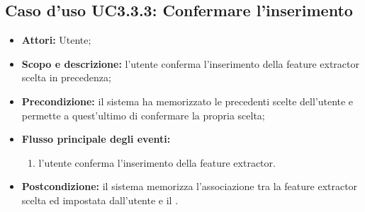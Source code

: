 \subsection{Caso d'uso UC3.3.3: Confermare l'inserimento}
\begin{itemize}
\item \textbf{Attori:} Utente;
\item \textbf{Scopo e descrizione:} l'utente conferma l'inserimento della feature extractor\glossario{} scelta in precedenza;
\item \textbf{Precondizione:} il sistema ha memorizzato le precedenti scelte dell'utente e permette a quest'ultimo di confermare la propria scelta;
\item \textbf{Flusso principale degli eventi:}
\begin{enumerate}
\item l'utente conferma l'inserimento della feature extractor\glossario{}.
\end{enumerate}
\item \textbf{Postcondizione:} il sistema memorizza l'associazione tra la feature extractor\glossario{} scelta ed impostata dall'utente e il \protocol{}.
\end{itemize}

